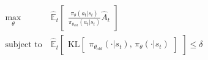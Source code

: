 %
\begin{equation} \label{eqn:TRPO_optimal}
\begin{aligned}
    \max_\theta\ & \hat{\mathbb{E}}_t\begin{bmatrix}\frac{\pi_{\theta}(a_t|s_t)}{\pi_{\theta_{\text{old}}}(a_t|s_t)}\hat{A}_t\end{bmatrix} \\
    \text{subject to}\ & \hat{\mathbb{E}}_t\begin{bmatrix}\text{KL}\begin{bmatrix}\pi_{\theta_{old}}(\cdot|s_t),\, \pi_{\theta}(\cdot|s_t)\end{bmatrix}\end{bmatrix} \leq \delta
\end{aligned}
\end{equation}

